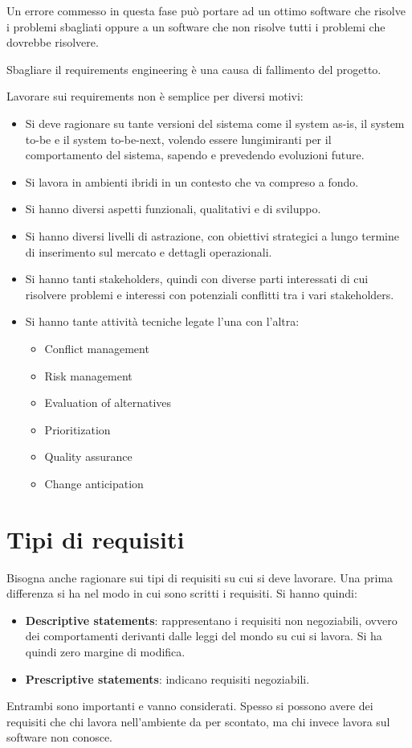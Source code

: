 Un errore commesso in questa fase può portare ad un ottimo software che risolve
i problemi sbagliati oppure a un software che non risolve tutti i problemi che
dovrebbe risolvere.
\begin{center}
      Sbagliare il requirements engineering è una causa di fallimento del progetto.
\end{center}
Lavorare sui requirements non è semplice per diversi motivi:
\begin{itemize}
      \item Si deve ragionare su tante versioni del sistema come il system as-is,
            il system to-be e il system to-be-next, volendo essere lungimiranti
            per il comportamento del sistema, sapendo e prevedendo evoluzioni future.
      \item Si lavora in ambienti ibridi in un contesto che va compreso a fondo.
      \item Si hanno diversi aspetti funzionali, qualitativi e di sviluppo.
      \item Si hanno diversi livelli di astrazione, con obiettivi strategici a
            lungo termine di inserimento sul mercato e dettagli operazionali.
      \item Si hanno tanti stakeholders, quindi con diverse parti interessati di
            cui risolvere problemi e interessi con potenziali conflitti tra i
            vari stakeholders.
      \item Si hanno tante attività tecniche legate l'una con l'altra:
            \begin{itemize}
                  \item Conflict management
                  \item Risk management
                  \item Evaluation of alternatives
                  \item Prioritization
                  \item Quality assurance
                  \item Change anticipation
            \end{itemize}
\end{itemize}
\section{Tipi di requisiti}
Bisogna anche ragionare sui tipi di requisiti su cui si deve lavorare. Una prima
differenza si ha nel modo in cui sono scritti i requisiti. Si hanno quindi:
\begin{itemize}
      \item \textbf{Descriptive statements}: rappresentano i requisiti non
            negoziabili, ovvero dei comportamenti derivanti dalle leggi del mondo
            su cui si lavora. Si ha quindi zero margine di modifica.
      \item \textbf{Prescriptive statements}: indicano requisiti negoziabili.
\end{itemize}
Entrambi sono importanti e vanno considerati. Spesso si possono avere dei
requisiti che chi lavora nell'ambiente da per scontato, ma chi invece lavora sul
software non conosce.

